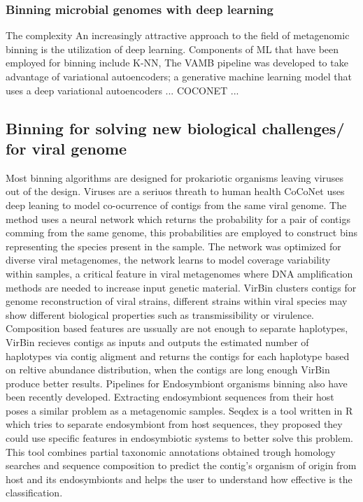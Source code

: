 \documentclass{article}
\begin{document}
\subsubsection{Binning microbial genomes with deep learning}
The complexity 
An increasingly attractive approach to the field of metagenomic binning is the utilization of deep learning.
Components of ML that have been employed for binning include K-NN, 
The \gls{VAMB} pipeline was developed to take advantage of variational autoencoders; a generative machine learning model that uses a deep variational autoencoders \cite{nissenimproved}...
COCONET \cite{arisdakessian2021coconet}...

\subsection{Binning for solving new biological challenges/ for viral genome}
Most binning algorithms are designed for prokariotic organisms leaving viruses out of the design. Viruses are a seriuos threath to human health
CoCoNet uses deep leaning to model co-ocurrence of contigs from the same viral genome. The method uses a neural network which returns the probability for a pair of contigs comming  from the same genome, this probabilities are employed to construct bins representing the species present in the sample. The network was optimized for diverse viral metagenomes, the network learns to model coverage variability within samples, a critical feature in viral metagenomes where DNA amplification methods are needed to increase input genetic material.
VirBin clusters contigs for genome reconstruction of viral strains, different strains within viral species may show different biological properties such as transmissibility or virulence. Composition based features are ussually are not enough to separate haplotypes, VirBin recieves contigs as inputs and outputs the estimated number of haplotypes via contig aligment and returns the contigs for each haplotype based on reltive abundance distribution, when the contigs are long enough VirBin produce better results.
Pipelines for Endosymbiont organisms binning also have been recently developed. Extracting endosymbiont sequences from their host poses a similar problem as a metagenomic samples.  
Seqdex is a tool written in R which tries to separate endosymbiont from host sequences, they proposed they could use specific features in endosymbiotic systems to better solve this problem. This tool combines partial taxonomic annotations obtained trough homology searches and sequence composition to predict the contig's organism of origin from host and its endosymbionts and helps the user to understand how effective is the classification.
\end{document}
